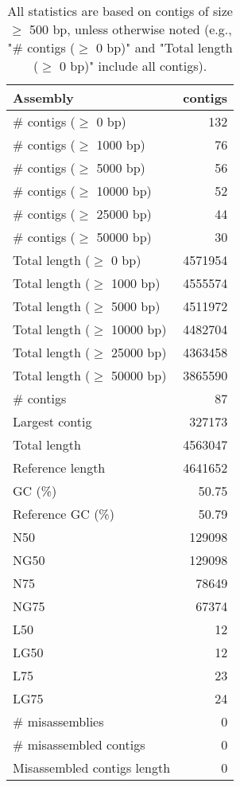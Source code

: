 \documentclass[12pt,a4paper]{article}
\begin{document}
\begin{table}[ht]
\begin{center}
\caption{All statistics are based on contigs of size $\geq$ 500 bp, unless otherwise noted (e.g., "\# contigs ($\geq$ 0 bp)" and "Total length ($\geq$ 0 bp)" include all contigs).}
\begin{tabular}{|l*{1}{|r}|}
\hline
Assembly & contigs \\ \hline
\# contigs ($\geq$ 0 bp) & 132 \\ \hline
\# contigs ($\geq$ 1000 bp) & 76 \\ \hline
\# contigs ($\geq$ 5000 bp) & 56 \\ \hline
\# contigs ($\geq$ 10000 bp) & 52 \\ \hline
\# contigs ($\geq$ 25000 bp) & 44 \\ \hline
\# contigs ($\geq$ 50000 bp) & 30 \\ \hline
Total length ($\geq$ 0 bp) & 4571954 \\ \hline
Total length ($\geq$ 1000 bp) & 4555574 \\ \hline
Total length ($\geq$ 5000 bp) & 4511972 \\ \hline
Total length ($\geq$ 10000 bp) & 4482704 \\ \hline
Total length ($\geq$ 25000 bp) & 4363458 \\ \hline
Total length ($\geq$ 50000 bp) & 3865590 \\ \hline
\# contigs & 87 \\ \hline
Largest contig & 327173 \\ \hline
Total length & 4563047 \\ \hline
Reference length & 4641652 \\ \hline
GC (\%) & 50.75 \\ \hline
Reference GC (\%) & 50.79 \\ \hline
N50 & 129098 \\ \hline
NG50 & 129098 \\ \hline
N75 & 78649 \\ \hline
NG75 & 67374 \\ \hline
L50 & 12 \\ \hline
LG50 & 12 \\ \hline
L75 & 23 \\ \hline
LG75 & 24 \\ \hline
\# misassemblies & 0 \\ \hline
\# misassembled contigs & 0 \\ \hline
Misassembled contigs length & 0 \\ \hline

\end{tabular}
\end{center}
\end{table}
\end{document}
